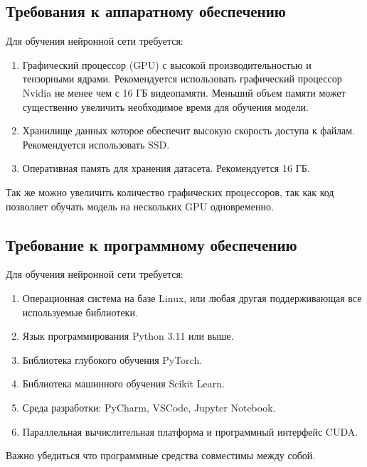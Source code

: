 \documentclass[../part_2.tex]{subfiles}
\begin{document}
\subsection{Требования к аппаратному обеспечению}
\par Для обучения нейронной сети требуется:
\begin{enumerate}
    \item Графический процессор (GPU) с высокой производительностью и тензорными ядрами. Рекомендуется использовать графический процессор Nvidia не менее чем с 16 ГБ видеопамяти. Меньший объем памяти может существенно увеличить необходимое время для обучения модели.
    \item Хранилище данных которое обеспечит высокую скорость доступа к файлам. Рекомендуется использовать SSD.
    \item Оперативная память для хранения датасета. Рекомендуется 16 ГБ.
\end{enumerate}
\par Так же можно увеличить количество графических процессоров, так как код позволяет обучать модель на нескольких GPU одновременно.
\subsection{Требование к программному обеспечению}
\par Для обучения нейронной сети требуется:
\begin{enumerate}
    \item Операционная система на базе Linux, или любая другая поддерживающая все используемые библиотеки.
    \item Язык программирования Python 3.11 или выше.
    \item Библиотека глубокого обучения PyTorch.
    \item Библиотека машинного обучения Scikit Learn.
    \item Среда разработки: PyCharm, VSCode, Jupyter Notebook.
    \item Параллельная вычислительная платформа и программный интерфейс CUDA.
\end{enumerate}
\par Важно убедиться что программные средства совместимы между собой.
\end{document}
